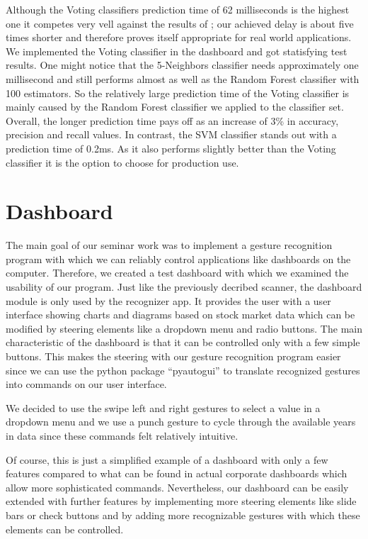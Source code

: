 Although the Voting classifiers prediction time of 62 milliseconds is the highest one it competes very vell against the results of \cite{liu}; our achieved delay is about five times shorter and therefore proves itself appropriate for real world applications. We implemented the Voting classifier in the dashboard and got statisfying test results. One might notice that the 5-Neighbors classifier needs approximately one millisecond and still performs almost as well as the Random Forest classifier with 100 estimators. So the relatively large prediction time of the Voting classifier is mainly caused by the Random Forest classifier we applied to the classifier set. Overall, the longer prediction time pays off as an increase of 3\% in accuracy, precision and recall values. 
In contrast, the SVM classifier stands out with a prediction time of 0.2ms. As it also performs slightly better than the Voting classifier it is the option to choose for production use.


\chapter{Dashboard}
\label{ch:Dashboard}

The main goal of our seminar work was to implement a gesture recognition program with which we can reliably control applications like dashboards on the computer.
Therefore, we created a test dashboard with which we examined the usability of our program.
Just like the previously decribed scanner, the dashboard module is only used by the recognizer app.
It provides the user with a user interface showing charts and diagrams based on stock market data which can be modified by steering elements like a dropdown menu and radio buttons.
The main characteristic of the dashboard is that it can be controlled only with a few simple buttons.
This makes the steering with our gesture recognition program easier since we can use the python package “pyautogui” to translate recognized gestures into commands on our user interface.

We decided to use the swipe left and right gestures to select a value in a dropdown menu and we use a punch gesture to cycle through the available years in data since these commands felt relatively intuitive. 

Of course, this is just a simplified example of a dashboard with only a few features compared to what can be found in actual corporate dashboards which allow more sophisticated commands.
Nevertheless, our dashboard can be easily extended with further features by implementing more steering elements like slide bars or check buttons and by adding more recognizable gestures with which these elements can be controlled.  

